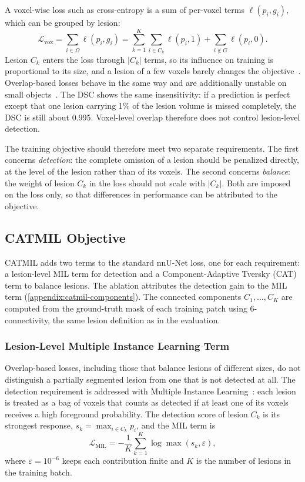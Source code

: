 A voxel-wise loss such as cross-entropy is a sum of per-voxel terms
$\ell(p_i, g_i)$, which can be grouped by lesion:
\begin{equation}
\mathcal{L}_{\mathrm{vox}}
=
\sum_{i \in \Omega} \ell(p_i, g_i)
=
\sum_{k=1}^{K} \sum_{i \in C_k} \ell(p_i, 1)
+
\sum_{i \notin G} \ell(p_i, 0) .
\label{eq:sl_voxel_loss}
\end{equation}
Lesion $C_k$ enters the loss through $|C_k|$ terms, so its influence on
training is proportional to its size, and a lesion of a few voxels barely
changes the objective~\cite{kofler_blob_2023}. Overlap-based losses behave
in the same way and are additionally unstable on small
objects~\cite{azad_loss_2023}. The DSC shows the same insensitivity: if a
prediction is perfect except that one lesion carrying 1\% of the lesion
volume is missed completely, the DSC is still about 0.995. Voxel-level
overlap therefore does not control lesion-level detection.

The training objective should therefore meet two separate requirements.
The first concerns \emph{detection}: the complete omission of a lesion
should be penalized directly, at the level of the lesion rather than of its
voxels. The second concerns \emph{balance}: the weight of lesion $C_k$ in
the loss should not scale with $|C_k|$. Both are imposed on the loss only, so
that differences in performance can be attributed to the objective.

\subsection{CATMIL Objective}

CATMIL adds two terms to the standard nnU-Net loss, one for each
requirement: a lesion-level MIL term for detection and a Component-Adaptive
Tversky (CAT) term to balance lesions. The ablation attributes the detection gain to the MIL term
(\cref{appendix:catmil-components}).
The connected components
$C_1,\ldots,C_K$ are computed from the ground-truth mask of each training
patch using 6-connectivity, the same lesion definition as in the
evaluation.

\subsubsection{Lesion-Level Multiple Instance Learning Term}

Overlap-based losses, including those that balance lesions of different
sizes, do not distinguish a partially segmented lesion from one that is not
detected at all. The detection requirement is addressed with Multiple
Instance Learning~\cite{ilse_attention-based_2018}: each lesion is treated
as a bag of voxels that counts as detected if at least one of its voxels
receives a high foreground probability. The detection score of lesion $C_k$ is its
strongest response, $s_k = \max_{i \in C_k} p_i$, and the MIL term is
\begin{equation}
\mathcal{L}_{\mathrm{MIL}}
=
-\frac{1}{K} \sum_{k=1}^{K} \log \max(s_k, \varepsilon) ,
\label{eq:sl_mil_loss}
\end{equation}
where $\varepsilon=10^{-6}$ keeps each contribution finite and $K$ is the
number of lesions in the training batch.

